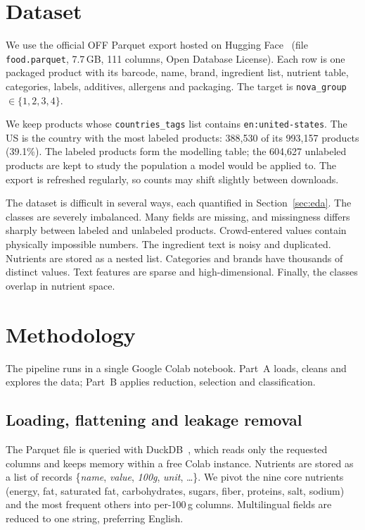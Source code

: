 \documentclass[conference]{IEEEtran}
\begin{document}
\section{Dataset}
\label{sec:data}

We use the official OFF Parquet export hosted on Hugging Face~\cite{offhf} (file \texttt{food.parquet}, 7.7\,GB, 111 columns, Open Database License). Each row is one packaged product with its barcode, name, brand, ingredient list, nutrient table, categories, labels, additives, allergens and packaging. The target is \texttt{nova\_group} $\in \{1,2,3,4\}$.

We keep products whose \texttt{countries\_tags} list contains \texttt{en:united-states}. The US is the country with the most labeled products: 388,530 of its 993,157 products (39.1\%). The labeled products form the modelling table; the 604,627 unlabeled products are kept to study the population a model would be applied to. The export is refreshed regularly, so counts may shift slightly between downloads.

The dataset is difficult in several ways, each quantified in Section~\ref{sec:eda}. The classes are severely imbalanced. Many fields are missing, and missingness differs sharply between labeled and unlabeled products. Crowd-entered values contain physically impossible numbers. The ingredient text is noisy and duplicated. Nutrients are stored as a nested list. Categories and brands have thousands of distinct values. Text features are sparse and high-dimensional. Finally, the classes overlap in nutrient space.

\section{Methodology}
\label{sec:method}

The pipeline runs in a single Google Colab notebook. Part~A loads, cleans and explores the data; Part~B applies reduction, selection and classification.

\subsection{Loading, flattening and leakage removal}
The Parquet file is queried with DuckDB~\cite{duckdb}, which reads only the requested columns and keeps memory within a free Colab instance. Nutrients are stored as a list of records \{\textit{name}, \textit{value}, \textit{100g}, \textit{unit}, \dots\}. We pivot the nine core nutrients (energy, fat, saturated fat, carbohydrates, sugars, fiber, proteins, salt, sodium) and the most frequent others into per-100\,g columns. Multilingual fields are reduced to one string, preferring English.
\end{document}
